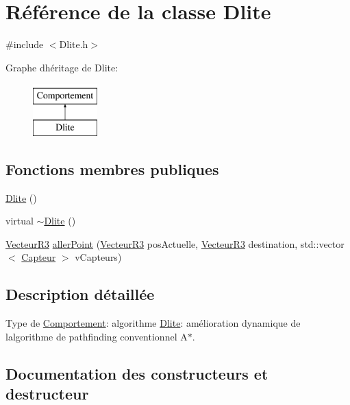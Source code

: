 \hypertarget{class_dlite}{}\section{Référence de la classe Dlite}
\label{class_dlite}


{\ttfamily \#include $<$Dlite.\+h$>$}

Graphe d\textquotesingle{}héritage de Dlite\+:\begin{figure}[H]
\begin{center}
\leavevmode
\includegraphics[height=2.000000cm]{class_dlite}
\end{center}
\end{figure}
\subsection*{Fonctions membres publiques}
\begin{DoxyCompactItemize}
\item 
\mbox{\hyperlink{class_dlite_a5f34443536a222e38f043d8370ca7b90}{Dlite}} ()
\item 
virtual \mbox{\hyperlink{class_dlite_ab98746140c7aa4ded45a47459b4c47d5}{$\sim$\+Dlite}} ()
\item 
\mbox{\hyperlink{class_vecteur_r3}{Vecteur\+R3}} \mbox{\hyperlink{class_dlite_a78c005fea65d3ae2429f74fd1d63c581}{aller\+Point}} (\mbox{\hyperlink{class_vecteur_r3}{Vecteur\+R3}} pos\+Actuelle, \mbox{\hyperlink{class_vecteur_r3}{Vecteur\+R3}} destination, std\+::vector$<$ \mbox{\hyperlink{class_capteur}{Capteur}} $>$ v\+Capteurs)
\end{DoxyCompactItemize}


\subsection{Description détaillée}
Type de \mbox{\hyperlink{class_comportement}{Comportement}}\+: algorithme \mbox{\hyperlink{class_dlite}{Dlite}}\+: amélioration dynamique de l\textquotesingle{}algorithme de pathfinding conventionnel A$\ast$. 

\subsection{Documentation des constructeurs et destructeur}
\mbox{\label{class_dlite_a5f34443536a222e38f043d8370ca7b90}} 
